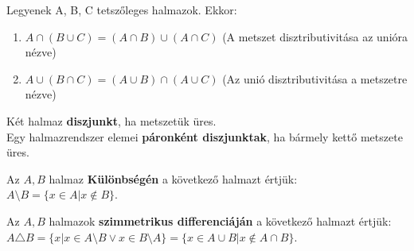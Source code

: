 \begin{frame}
  \begin{tcolorbox}[title={Tétel: Unió és metszet disztributivitása}]
    Legyenek A, B, C tetszőleges halmazok. Ekkor:

    \begin{enumerate}
      \item $A \cap (B \cup C) = (A \cap B) \cup (A \cap C)$ (A metszet disztributivitása az unióra nézve)
      \item $A \cup (B \cap C) = (A \cup B) \cap (A \cup C)$ (Az unió disztributivitása a metszetre nézve)
    \end{enumerate}
  \end{tcolorbox}
\end{frame}

\begin{frame}
  \begin{tcolorbox}[title={Def.: Diszjunkt, Páronként diszjunkt halmazok.}]
    Két halmaz \textbf{diszjunkt}, ha metszetük üres.\\
    Egy halmazrendszer elemei \textbf{páronként diszjunktak}, ha bármely kettő metszete üres.
  \end{tcolorbox}

  \begin{tcolorbox}[title={Def.: Halmazok Különbsége}]
    Az $A, B$ halmaz \textbf{Különbségén} a következő halmazt értjük:\\
    $A \setminus B = \{ x \in A | x \notin B \}$.
  \end{tcolorbox}

  \begin{tcolorbox}[title={Def.: Halmazok Szimmetrikus Differenciája}]
    Az $A, B$ halmazok \textbf{szimmetrikus differenciáján} a következő halmazt értjük:\\
    $A \triangle B = \{ x | x \in A \setminus B \lor x \in B \setminus A \} = \{ x \in A \cup B | x \notin A \cap B \}$.
  \end{tcolorbox}
\end{frame}

